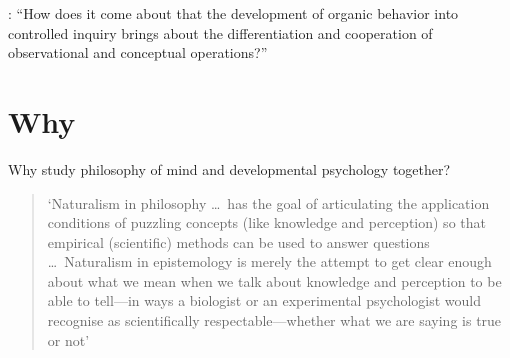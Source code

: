 \documentclass[12pt,\papersize]{extarticle}
\begin{document}
\citep[p.\ 12]{Dewey:1938yp}: “How does it come about that the development of organic behavior into controlled inquiry brings about the differentiation and cooperation of observational and conceptual operations?”

\section{Why}
Why study philosophy of mind and developmental psychology together?

\begin{quote}
`Naturalism in philosophy …\ has the goal of articulating the application conditions of puzzling concepts (like knowledge and perception) so that empirical (scientific) methods can be used to answer questions  …\ Naturalism in epistemology is merely the attempt to get clear enough about what we mean when we talk about knowledge and perception to be able to tell—in ways a biologist or an experimental psychologist would recognise as scientifically respectable—whether what we are saying is true or not' \citep[p.\ x]{Dretske:2000ky}
\end{quote}


\end{document}
